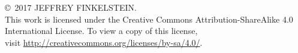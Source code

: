 \newenvironment{copyrightpage}
  {%
  \thispagestyle{empty}%
  \setlength{\parindent}{0pt}%
  \null
  \vfill
  }
  {\newpage}

\begin{copyrightpage}
  \copyright~2017 \uppercase{Jeffrey Finkelstein}.\\
  This work is licensed under the Creative Commons Attribution-ShareAlike 4.0\\ International License. To view a copy of this license,\\ visit \url{http://creativecommons.org/licenses/by-sa/4.0/}.
\end{copyrightpage}
